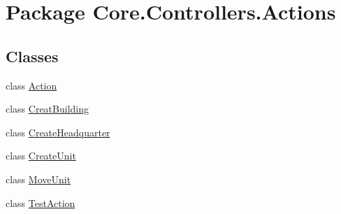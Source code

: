 \hypertarget{namespaceCore_1_1Controllers_1_1Actions}{\section{Package Core.\-Controllers.\-Actions}
\label{namespaceCore_1_1Controllers_1_1Actions}
}
\subsection*{Classes}
\begin{DoxyCompactItemize}
\item 
class \hyperlink{classCore_1_1Controllers_1_1Actions_1_1Action}{Action}
\item 
class \hyperlink{classCore_1_1Controllers_1_1Actions_1_1CreatBuilding}{Creat\-Building}
\item 
class \hyperlink{classCore_1_1Controllers_1_1Actions_1_1CreateHeadquarter}{Create\-Headquarter}
\item 
class \hyperlink{classCore_1_1Controllers_1_1Actions_1_1CreateUnit}{Create\-Unit}
\item 
class \hyperlink{classCore_1_1Controllers_1_1Actions_1_1MoveUnit}{Move\-Unit}
\item 
class \hyperlink{classCore_1_1Controllers_1_1Actions_1_1TestAction}{Test\-Action}
\end{DoxyCompactItemize}
